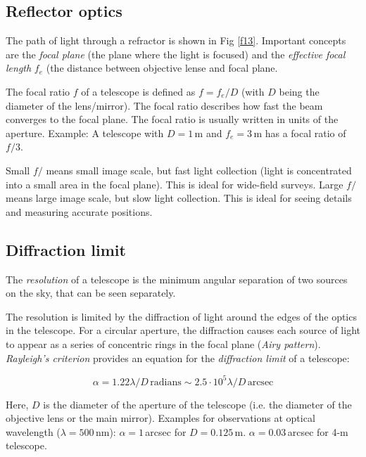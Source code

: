 \subsection{Reflector optics}

The path of light through a refractor is shown in Fig \ref{f13}. Important concepts are the \textit{focal plane} (the plane where the light is focused) and the \textit{effective focal length} $f_e$ (the distance between objective lense and focal plane.

The focal ratio $f$ of a telescope is defined as $f = f_e/D$ (with $D$ being the diameter of the lens/mirror). The focal ratio describes how fast the beam converges to the focal plane. The focal ratio is usually written in units of the aperture. Example: A telescope with $D = 1$\,m and $f_e = 3$\,m has a focal ratio of $f/3$. 

Small $f/$ means small image scale, but fast light collection (light is concentrated into a small area in the focal plane). This is ideal for wide-field surveys. Large $f/$ means large image scale, but slow light collection. This is ideal for seeing details and measuring accurate positions.

\subsection{Diffraction limit}

The \textit{resolution} of a telescope is the minimum angular separation of two sources on the sky, that can be seen separately. 

The resolution is limited by the diffraction of light around the edges of the optics in the telescope. For a circular aperture, the diffraction causes each source of light to appear as a series of concentric rings in the focal plane (\textit{Airy pattern}). \textit{Rayleigh's criterion} provides an equation for the \textit{diffraction limit} of a telescope:

\begin{equation}
\alpha = 1.22 \lambda / D\,\mathrm{radians} \sim 2.5 \cdot 10^5 \lambda / D\,\mathrm{arcsec}
\label{eq22}
\end{equation}

Here, $D$ is the diameter of the aperture of the telescope (i.e. the diameter of the objective lens or the main mirror). Examples for observations at optical wavelength ($\lambda = 500$\,nm): $\alpha = 1$\,arcsec for $D = 0.125$\,m. $\alpha = 0.03$\,arcsec for 4-m telescope.


